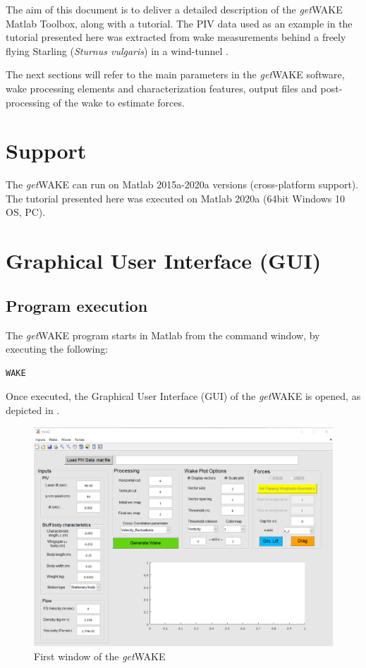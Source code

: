 \documentclass[12pt,a4paper]{article}
\begin{document}
The aim of this document is to deliver a detailed description of the \textit{get}WAKE Matlab Toolbox, along with a tutorial. The PIV data used as an example in the tutorial presented here was extracted from wake measurements behind a freely flying Starling (\textit{Sturnus vulgaris}) in a wind-tunnel \cite{Ben-Gida2013,Stalnov2015,Nafi2020}. 

The next sections will refer to the main parameters in the \textit{get}WAKE software, wake processing elements and characterization features, output files and post-processing of the wake to estimate forces. 

\section{Support}\label{Support}

The \textit{get}WAKE can run on Matlab 2015a-2020a versions (cross-platform support).
The tutorial presented here was executed on Matlab 2020a (64bit Windows 10 OS, PC).


\section{Graphical User Interface (GUI)}\label{GUI}

\subsection{Program execution}
The \textit{get}WAKE program starts in Matlab from the command window, by executing the following:

\begin{lstlisting}
WAKE
\end{lstlisting}

Once executed, the Graphical User Interface (GUI) of the \textit{get}WAKE is opened, as depicted in .

\begin{figure}[ht!]
	\centering
	\includegraphics[width=\textwidth]{openwindow}
	\caption{First window of the \textit{get}WAKE}
	\label{fig:GUI-open_window}
\end{figure}	
\end{document}
